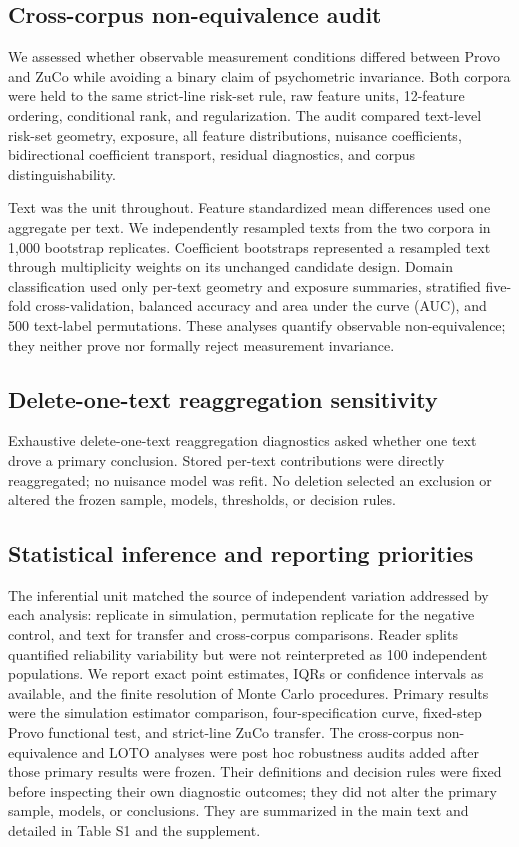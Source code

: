 \documentclass[11pt]{article}
\begin{document}
\subsection{Cross-corpus non-equivalence audit}

We assessed whether observable measurement conditions differed between Provo and ZuCo while avoiding a binary claim of psychometric invariance. Both corpora were held to the same strict-line risk-set rule, raw feature units, 12-feature ordering, conditional rank, and regularization. The audit compared text-level risk-set geometry, exposure, all feature distributions, nuisance coefficients, bidirectional coefficient transport, residual diagnostics, and corpus distinguishability.

Text was the unit throughout. Feature standardized mean differences used one aggregate per text. We independently resampled texts from the two corpora in 1,000 bootstrap replicates. Coefficient bootstraps represented a resampled text through multiplicity weights on its unchanged candidate design. Domain classification used only per-text geometry and exposure summaries, stratified five-fold cross-validation, balanced accuracy and area under the curve (AUC), and 500 text-label permutations. These analyses quantify observable non-equivalence; they neither prove nor formally reject measurement invariance.

\subsection{Delete-one-text reaggregation sensitivity}

Exhaustive delete-one-text reaggregation diagnostics asked whether one text drove a primary conclusion. Stored per-text contributions were directly reaggregated; no nuisance model was refit. No deletion selected an exclusion or altered the frozen sample, models, thresholds, or decision rules.

\subsection{Statistical inference and reporting priorities}

The inferential unit matched the source of independent variation addressed by each analysis: replicate in simulation, permutation replicate for the negative control, and text for transfer and cross-corpus comparisons. Reader splits quantified reliability variability but were not reinterpreted as 100 independent populations. We report exact point estimates, IQRs or confidence intervals as available, and the finite resolution of Monte Carlo procedures. Primary results were the simulation estimator comparison, four-specification curve, fixed-step Provo functional test, and strict-line ZuCo transfer. The cross-corpus non-equivalence and LOTO analyses were post hoc robustness audits added after those primary results were frozen. Their definitions and decision rules were fixed before inspecting their own diagnostic outcomes; they did not alter the primary sample, models, or conclusions. They are summarized in the main text and detailed in Table S1 and the supplement.
\end{document}
